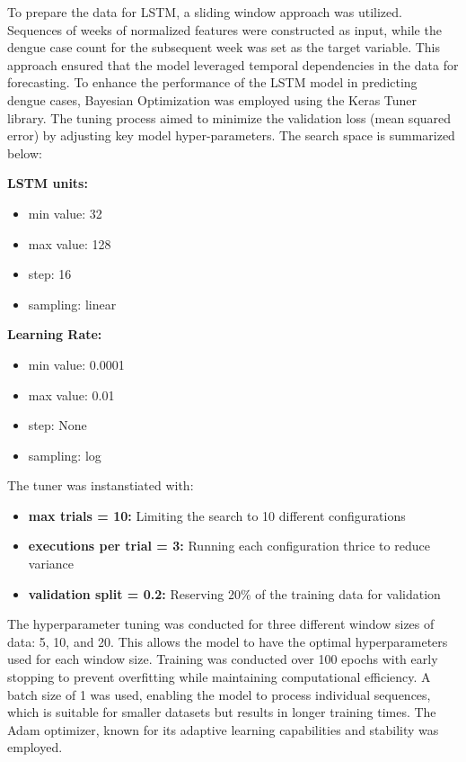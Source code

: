 To prepare the data for LSTM, a sliding window approach was utilized. Sequences of weeks of normalized features were constructed as input, while the dengue case count for the subsequent week was set as the target variable. This approach ensured that the model leveraged temporal dependencies in the data for forecasting. To enhance the performance of the LSTM model in predicting dengue cases, Bayesian Optimization was employed using the Keras Tuner library. The tuning process aimed to minimize the validation loss (mean squared error) by adjusting key model hyper-parameters. The search space is summarized below:

\textbf{LSTM units:}
\begin{itemize}
	\item  min value: 32 
	\item	max value: 128
	\item	step: 16
	\item	sampling: linear
\end{itemize}
\textbf{Learning Rate:}
\begin{itemize}
	\item  min value: 0.0001 
	\item	max value: 0.01
	\item	step: None
	\item	sampling: log
\end{itemize}



The tuner was instanstiated with:
\begin{itemize}
	\item \textbf{max trials = 10:} Limiting the search to 10 different configurations
	\item \textbf{executions per trial = 3:} Running each configuration thrice to reduce variance
	\item \textbf{validation split = 0.2:} Reserving 20\% of the training data for validation
\end{itemize}

The hyperparameter tuning was conducted for three different window sizes of data: 5, 10, and 20. This allows the model to have the optimal hyperparameters used for each window size. Training was conducted over 100 epochs with early stopping to prevent overfitting while maintaining computational efficiency. A batch size of 1 was used, enabling the model to process individual sequences, which is suitable for smaller datasets but results in longer training times. The Adam optimizer, known for its adaptive learning capabilities and stability was employed.

